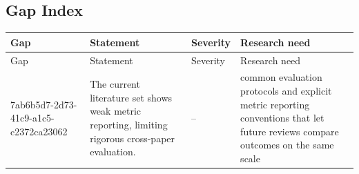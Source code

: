 \documentclass{article}
\begin{document}
\subsection{Gap Index}
\begin{longtable}{p{}p{}p{}p{}}
\toprule
Gap & Statement & Severity & Research need \\
\midrule
\endfirsthead
\toprule
Gap & Statement & Severity & Research need \\
\midrule
\endhead
7ab6b5d7-2d73-41c9-a1c5-c2372ca23062 & The current literature set shows weak metric reporting, limiting rigorous cross-paper evaluation. & -- & common evaluation protocols and explicit metric reporting conventions that let future reviews compare outcomes on the same scale \\
\bottomrule
\end{longtable}
\end{document}
